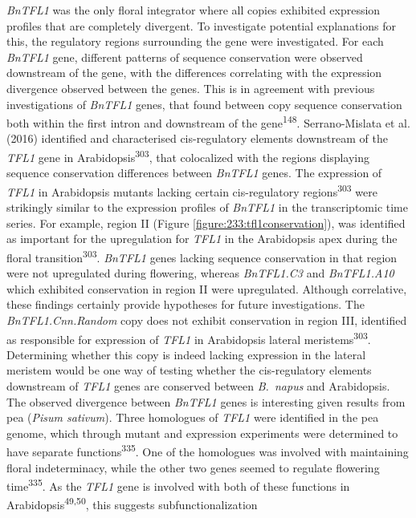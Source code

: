 \documentclass[12pt,]{book}
\begin{document}
\emph{BnTFL1} was the only floral integrator where all copies exhibited
expression profiles that are completely divergent. To investigate
potential explanations for this, the regulatory regions surrounding the
gene were investigated. For each \emph{BnTFL1} gene, different patterns
of sequence conservation were observed downstream of the gene, with the
differences correlating with the expression divergence observed between
the genes. This is in agreement with previous investigations of
\emph{BnTFL1} genes, that found between copy sequence conservation both
within the first intron and downstream of the gene\textsuperscript{148}.
Serrano-Mislata et al. (2016) identified and characterised
cis-regulatory elements downstream of the \emph{TFL1} gene in
Arabidopsis\textsuperscript{303}, that colocalized with the regions
displaying sequence conservation differences between \emph{BnTFL1}
genes. The expression of \emph{TFL1} in Arabidopsis mutants lacking
certain cis-regulatory regions\textsuperscript{303} were strikingly
similar to the expression profiles of \emph{BnTFL1} in the
transcriptomic time series. For example, region II (Figure
\ref{figure:233:tfl1conservation}), was identified as important for the
upregulation for \emph{TFL1} in the Arabidopsis apex during the floral
transition\textsuperscript{303}. \emph{BnTFL1} genes lacking sequence
conservation in that region were not upregulated during flowering,
whereas \emph{BnTFL1.C3} and \emph{BnTFL1.A10} which exhibited
conservation in region II were upregulated. Although correlative, these
findings certainly provide hypotheses for future investigations. The
\emph{BnTFL1.Cnn.Random} copy does not exhibit conservation in region
III, identified as responsible for expression of \emph{TFL1} in
Arabidopsis lateral meristems\textsuperscript{303}. Determining whether
this copy is indeed lacking expression in the lateral meristem would be
one way of testing whether the cis-regulatory elements downstream of
\emph{TFL1} genes are conserved between \emph{B.~napus} and Arabidopsis.
The observed divergence between \emph{BnTFL1} genes is interesting given
results from pea (\emph{Pisum sativum}). Three homologues of \emph{TFL1}
were identified in the pea genome, which through mutant and expression
experiments were determined to have separate
functions\textsuperscript{335}. One of the homologues was involved with
maintaining floral indeterminacy, while the other two genes seemed to
regulate flowering time\textsuperscript{335}. As the \emph{TFL1} gene is
involved with both of these functions in
Arabidopsis\textsuperscript{49,50}, this suggests subfunctionalization
\end{document}
